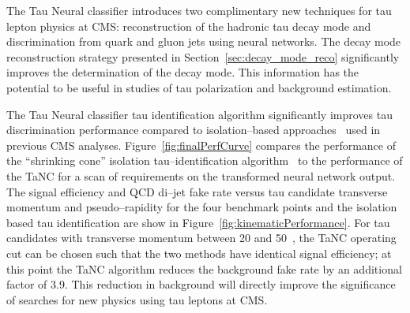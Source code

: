 The Tau Neural classifier introduces two complimentary new techniques for tau
lepton physics at CMS: reconstruction of the hadronic tau decay mode and
discrimination from quark and gluon jets using neural networks.  The decay mode
reconstruction strategy presented in Section~\ref{sec:decay_mode_reco}
significantly improves the determination of the decay mode. This information has
the potential to be useful in studies of tau polarization and background
estimation.

The Tau Neural classifier tau identification algorithm significantly improves
tau discrimination performance compared to isolation--based
approaches~\cite{CMS-PAS-PFT-08-001} used in previous CMS analyses.
Figure~\ref{fig:finalPerfCurve} compares the performance of the ``shrinking
cone'' isolation tau--identification algorithm~\cite{CMS-PAS-PFT-08-001} to the
performance of the TaNC for a scan of requirements on the transformed neural
network output.  The signal efficiency and QCD di--jet fake rate versus
tau candidate transverse momentum and pseudo--rapidity for the four benchmark
points and the isolation based tau identification are show in
Figure~\ref{fig:kinematicPerformance}.  For tau candidates with transverse
momentum between 20 and 50~\GeVc, the TaNC operating cut can be chosen such that
the two methods have identical signal efficiency; at this point the TaNC
algorithm reduces the background fake rate by an additional factor of 3.9.  This
reduction in background will directly improve the significance of searches for
new physics using tau leptons at CMS.

